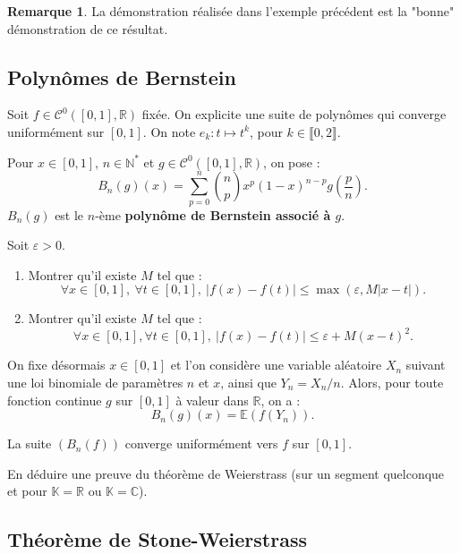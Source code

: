 \documentclass[french]{article}
\newcommand{\N}{\mathbb{N}}
\newcommand{\R}{\mathbb{R}}
\newcommand{\C}{\mathbb{C}}
\newcommand{\K}{\mathbb{K}}
\newcommand{\st}{^*}
\newcommand{\E}{\mathbb{E}}
\theoremstyle{plain}
\theoremstyle{definition}
\newtheorem*{rmq}{Remarque}
\theoremstyle{remark}
\begin{document}
\begin{rmq}
	La démonstration réalisée dans l'exemple précédent est la "bonne" démonstration de ce résultat.
\end{rmq}

\subsection{Polynômes de Bernstein}

Soit $f\in\mathcal{C}^0([0,1],\R)$ fixée. On explicite une suite de polynômes qui converge uniformément sur $[0,1]$. On note $e_k:t\mapsto t^k$, pour $k\in\llbracket0,2\rrbracket$.

\begin{dfn}
	Pour $x\in[0,1]$, $n\in\N\st$ et $g\in\mathcal{C}^0([0,1],\R)$, on pose :
	$$B_n(g)(x)=\sum_{p=0}^{n}\binom{n}{p}x^p(1-x)^{n-p}g\left(\frac{p}{n}\right).$$
	$B_n(g)$ est le $n$-ème \textbf{polynôme de Bernstein associé à $g$}. 
\end{dfn}

\begin{exo}
	Soit $\varepsilon>0$.
	\begin{enumerate}
		\item Montrer qu'il existe $M$ tel que :
		$$\forall x\in[0,1],\ \forall t\in[0,1],\ \lvert f(x)-f(t)\rvert\leqslant\max(\varepsilon,M\lvert x-t\rvert).$$
		\item Montrer qu'il existe $M$ tel que :
		$$\forall x\in[0,1],\forall t\in[0,1],\ \lvert f(x)-f(t)\rvert\leqslant\varepsilon+M(x-t)^2.$$
	\end{enumerate}
\end{exo}

On fixe désormais $x\in[0,1]$ et l'on considère une variable aléatoire $X_n$ suivant une loi binomiale de paramètres $n$ et $x$, ainsi que $Y_n=X_n/n$. Alors, pour toute fonction continue $g$ sur $[0,1]$ à valeur dans $\R$, on a :
$$B_n(g)(x)=\E(f(Y_n)).$$

\begin{thm}%
	La suite $(B_n(f))$ converge uniformément vers $f$ sur $[0,1]$.
\end{thm}

\begin{exo}
	En déduire une preuve du théorème de Weierstrass (sur un segment quelconque et pour $\K=\R$ ou $\K=\C$).
\end{exo}

\subsection{Théorème de Stone-Weierstrass}
\end{document}
